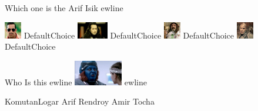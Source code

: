 \documentclass{exam}
\begin{document}
\begin{questions}
\question Which one is the Arif Isik
ewline
\begin{oneparchoices}
\choice \includegraphics[height=2em]{arifisik.jpg}
DefaultChoice
\choice \includegraphics[height=2em]{komutanlogar.jpeg}
DefaultChoice
\choice \includegraphics[height=2em]{faruk.jpg}
DefaultChoice
\choice \includegraphics[height=2em]{216.jpg}
DefaultChoice
\end{oneparchoices}
\question Who Is this
ewline
\includegraphics[height=3em]{rendroy2.jpg} 
ewline
\begin{oneparchoices}
\choice KomutanLogar
\choice Arif
\choice Rendroy
\choice Amir Tocha
\end{oneparchoices}
\end{questions}
\end{document}
